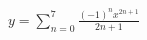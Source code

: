 \documentclass[preview]{standalone}
\begin{document}
\begin{align*}
y = \sum_{n=0}^{7} \frac{(-1)^n x^{2n+1}}{2n+1}
\end{align*}
\end{document}
